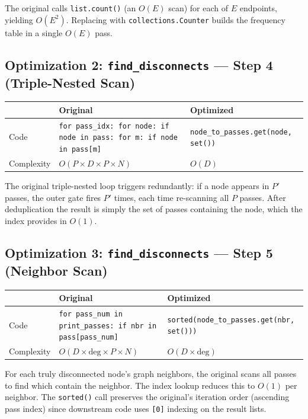 \documentclass[11pt,a4paper]{article}
\begin{document}
The original calls \texttt{list.count()} (an $O(E)$ scan) for each of $E$ endpoints, yielding $O(E^2)$. Replacing with \texttt{collections.Counter} builds the frequency table in a single $O(E)$ pass.

\subsection{Optimization 2: \texttt{find\_disconnects} --- Step 4 (Triple-Nested Scan)}

\begin{table}[H]
\centering
\begin{tabularx}{\textwidth}{lXX}
\toprule
& \textbf{Original} & \textbf{Optimized} \\
\midrule
Code & \texttt{for pass\_idx: for node: if node in pass: for m: if node in pass[m]} & \texttt{node\_to\_passes.get(node, set())} \\
Complexity & $O(P \times D \times P \times N)$ & $O(D)$ \\
\bottomrule
\end{tabularx}
\end{table}

The original triple-nested loop triggers redundantly: if a node appears in $P'$ passes, the outer gate fires $P'$ times, each time re-scanning all $P$ passes. After deduplication the result is simply the set of passes containing the node, which the index provides in $O(1)$.

\subsection{Optimization 3: \texttt{find\_disconnects} --- Step 5 (Neighbor Scan)}

\begin{table}[H]
\centering
\begin{tabularx}{\textwidth}{lXX}
\toprule
& \textbf{Original} & \textbf{Optimized} \\
\midrule
Code & \texttt{for pass\_num in print\_passes: if nbr in pass[pass\_num]} & \texttt{sorted(node\_to\_passes.get(nbr, set()))} \\
Complexity & $O(D \times \text{deg} \times P \times N)$ & $O(D \times \text{deg})$ \\
\bottomrule
\end{tabularx}
\end{table}

For each truly disconnected node's graph neighbors, the original scans all passes to find which contain the neighbor. The index lookup reduces this to $O(1)$ per neighbor. The \texttt{sorted()} call preserves the original's iteration order (ascending pass index) since downstream code uses \texttt{[0]} indexing on the result lists.
\end{document}
